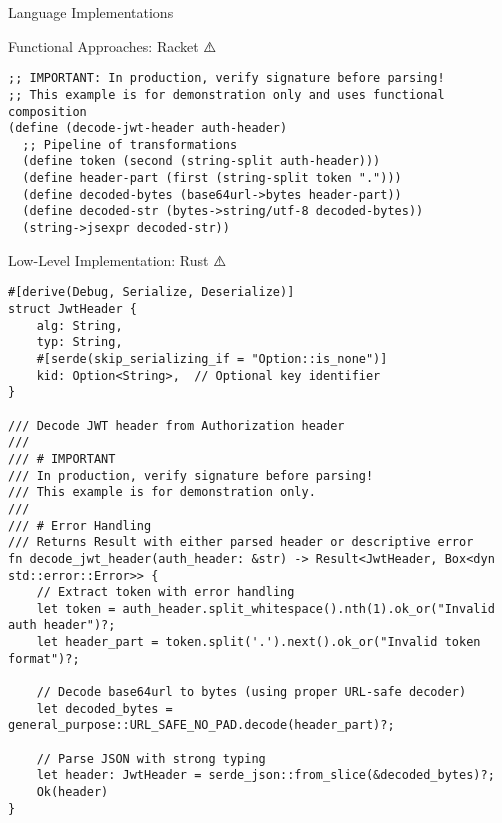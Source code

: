 \documentclass[presentation,aspectratio=169]{beamer}
\begin{document}
\begin{frame}[label={sec:org522ed70},fragile]{Language Implementations}
\begin{block}{Functional Approaches: Racket ⚠️}
\begin{verbatim}
;; IMPORTANT: In production, verify signature before parsing!
;; This example is for demonstration only and uses functional composition
(define (decode-jwt-header auth-header)
  ;; Pipeline of transformations
  (define token (second (string-split auth-header)))
  (define header-part (first (string-split token ".")))
  (define decoded-bytes (base64url->bytes header-part))
  (define decoded-str (bytes->string/utf-8 decoded-bytes))
  (string->jsexpr decoded-str))
\end{verbatim}
\end{block}
\begin{block}{Low-Level Implementation: Rust ⚠️}
\begin{verbatim}
#[derive(Debug, Serialize, Deserialize)]
struct JwtHeader {
    alg: String,
    typ: String,
    #[serde(skip_serializing_if = "Option::is_none")]
    kid: Option<String>,  // Optional key identifier
}

/// Decode JWT header from Authorization header
/// 
/// # IMPORTANT
/// In production, verify signature before parsing!
/// This example is for demonstration only.
/// 
/// # Error Handling
/// Returns Result with either parsed header or descriptive error
fn decode_jwt_header(auth_header: &str) -> Result<JwtHeader, Box<dyn std::error::Error>> {
    // Extract token with error handling
    let token = auth_header.split_whitespace().nth(1).ok_or("Invalid auth header")?;
    let header_part = token.split('.').next().ok_or("Invalid token format")?;

    // Decode base64url to bytes (using proper URL-safe decoder)
    let decoded_bytes = general_purpose::URL_SAFE_NO_PAD.decode(header_part)?;

    // Parse JSON with strong typing
    let header: JwtHeader = serde_json::from_slice(&decoded_bytes)?;
    Ok(header)
}
\end{verbatim}
\end{block}
\end{frame}
\end{document}
